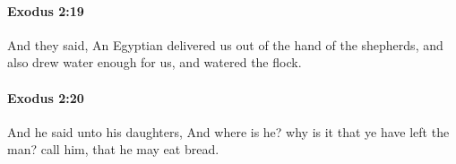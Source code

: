 		\paragraph{Exodus 2:19} %
			\label{EXODUS-2-19}

			And they said, An Egyptian delivered us out of the hand of the shepherds, and also drew water enough for us, and watered the flock.


		\paragraph{Exodus 2:20} %
			\label{EXODUS-2-20}

			And he said unto his daughters, And where is he? why is it that ye have left the man? call him, that he may eat bread.


